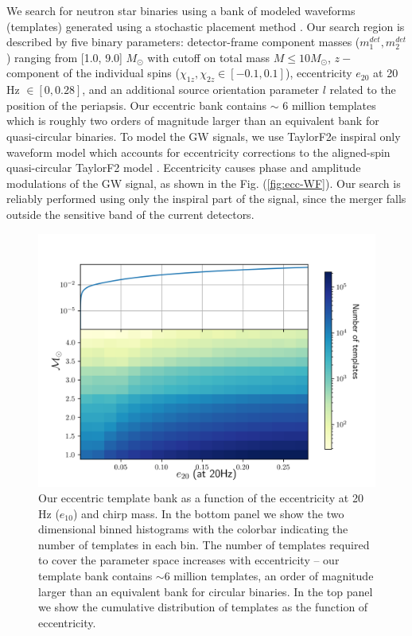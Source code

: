 We search for neutron star binaries using a bank of modeled waveforms (templates) generated using a stochastic placement method \cite{Harry:2009ea,Babak:2008rb}. Our   
search region is described by five binary parameters: detector-frame component masses ($m_1^{det}, m_2^{det}$) ranging from [1.0, 9.0] $M_{\odot}$ with cutoff on total mass $M \leq 10 M_{\odot}$, $z-$ component of the individual spins ($\chi_{1z}, \chi_{2z} \in [-0.1, 0.1]$), eccentricity $e_{20}$ at 20 Hz $\in [0, 0.28]$, and an additional source orientation parameter $l$ related to the position of the periapsis. Our eccentric bank contains $\sim$ 6 million templates which is roughly two orders of magnitude larger than an equivalent bank for quasi-circular binaries. To model the GW signals, we use TaylorF2e inspiral only waveform model \cite{Moore:2016qxz} which accounts for eccentricity corrections to the aligned-spin quasi-circular TaylorF2 model \cite{Buonanno:2009zt}. Eccentricity causes phase and amplitude modulations of the GW signal, as shown in the Fig. (\ref{fig:ecc-WF}). Our search is reliably performed using only the inspiral part of the signal, since the merger falls outside the sensitive band of the current detectors. 

\begin{figure}
    \centering
    \includegraphics[width=\textwidth]{figures/ecc_search/bank_density.png}
    \caption{Our eccentric template bank as a function of the eccentricity at 20 Hz ($e_{10}$) and chirp mass. In the bottom panel we show the two dimensional binned histograms with the colorbar indicating the number of templates in each bin. The number of templates required to cover the parameter space increases with eccentricity -- our template bank contains $\sim 6$ million templates, an order of magnitude larger than an equivalent bank for circular binaries. In the top panel we show the cumulative distribution of templates as the function of eccentricity.}
    \label{fig:ecc-bank}
\end{figure}

